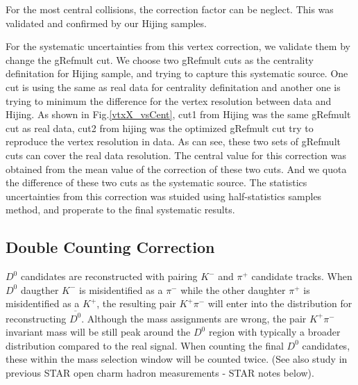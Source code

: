 For the most central collisions, the correction factor can be neglect. This was validated and confirmed by our Hijing samples.


For the systematic uncertainties from this vertex correction, we validate them by change the gRefmult cut. We choose two gRefmult cuts as the centrality definitation for Hijing sample, and trying to capture this systematic source. One cut is using the same as real data for centrality definitation and another one is trying to minimum the difference for the vertex resolution between data and Hijing. As shown in Fig.\ref{vtxX_vsCent}, cut1 from Hijing was the same gRefmult cut as real data, cut2 from hijing was the optimized gRefmult cut try to reproduce the vertex resolution in data. As can see, these two sets of gRefmult cuts can cover the real data resolution. The central value for this correction was obtained from the mean value of the correction of these two cuts. And we quota the difference of these two cuts as the systematic source. The statistics uncertainties from this correction was stuided using half-statistics samples method, and properate to the final systematic results.

\subsection{Double Counting Correction} 





$D^0$ candidates are reconstructed with pairing $K^-$ and $\pi^+$ candidate tracks. When $D^0$ daugther $K^-$ is misidentified as a $\pi^-$ while the other daughter $\pi^+$ is misidentified as a $K^+$, the resulting pair $K^+\pi^-$ will enter into the distribution for reconstructing $\overline{D^0}$. Although the mass assignments are wrong, the pair $K^+\pi^-$ invariant mass will be still peak around the $D^0$ region with typically a broader distribution compared to the real signal. When counting the final $D^0$ candidates, these within the mass selection window will be counted twice. (See also study in previous STAR open charm hadron measurements - STAR notes below).

